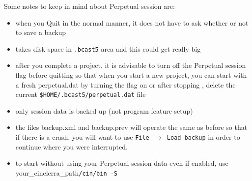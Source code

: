 Some notes to keep in mind about Perpetual session are:

\begin{itemize}
    \item when you Quit in the normal manner, it does not have to ask whether or not to save a backup
    \item takes disk space in \texttt{.bcast5} area and this could get really big
    \item after you complete a project, it is advisable to turn off the Perpetual session flag before quitting so
    that when you start a new project, you can start with a fresh perpetual.dat by turning the flag on or
    after stopping \CGG{}, delete the current \texttt{\$HOME/.bcast5/perpetual.dat} file
    \item only session data is backed up (not program feature setup)
    \item the files backup.xml and backup.prev will operate the same as before so that if there is a crash, you
    will want to use \texttt{File $\rightarrow$ Load backup} in order to continue where you were interrupted.
    \item to start \CGG{} without using your Perpetual session data even if enabled, use your\_cinelerra\_path\texttt{/cin/bin -S}
\end{itemize}

